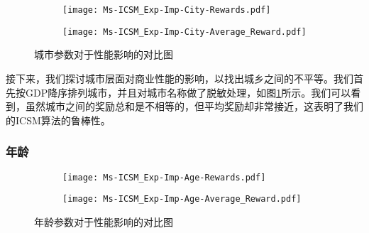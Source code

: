 \begin{figure}[!htb]
	\centering
	\begin{subfigure}[t]{0.49\linewidth}
		\captionsetup{justification=centering} %
		\begin{minipage}[b]{1\linewidth}
			\texttt{[image: Ms-ICSM\_Exp-Imp-City-Rewards.pdf]}
			\caption{}
		\end{minipage}
	\end{subfigure}
	\begin{subfigure}[t]{0.49\linewidth}
		\captionsetup{justification=centering} %
		\begin{minipage}[b]{1\linewidth}
			\texttt{[image: Ms-ICSM\_Exp-Imp-City-Average\_Reward.pdf]}
			\caption{}
		\end{minipage}
	\end{subfigure}	
	\caption{城市参数对于性能影响的对比图}
	\label{Fig:Exp-Imp-City}
\end{figure}

接下来，我们探讨城市层面对商业性能的影响，以找出城乡之间的不平等。我们首先按GDP降序排列城市，并且对城市名称做了脱敏处理，如图\ref{Fig:Exp-Imp-City}所示。我们可以看到，虽然城市之间的奖励总和是不相等的，但平均奖励却非常接近，这表明了我们的ICSM算法的鲁棒性。

\subsubsection{年龄}
\begin{figure}[!htb]
	\centering
	\begin{subfigure}[t]{0.49\linewidth}
		\captionsetup{justification=centering} %
		\begin{minipage}[b]{1\linewidth}
			\texttt{[image: Ms-ICSM\_Exp-Imp-Age-Rewards.pdf]}
			\caption{}
		\end{minipage}
	\end{subfigure}
	\begin{subfigure}[t]{0.49\linewidth}
		\captionsetup{justification=centering} %
		\begin{minipage}[b]{1\linewidth}
			\texttt{[image: Ms-ICSM\_Exp-Imp-Age-Average\_Reward.pdf]}
			\caption{}
		\end{minipage}
	\end{subfigure}	
	\caption{年龄参数对于性能影响的对比图}
	\label{Fig:Exp-Imp-Age}
\end{figure}


